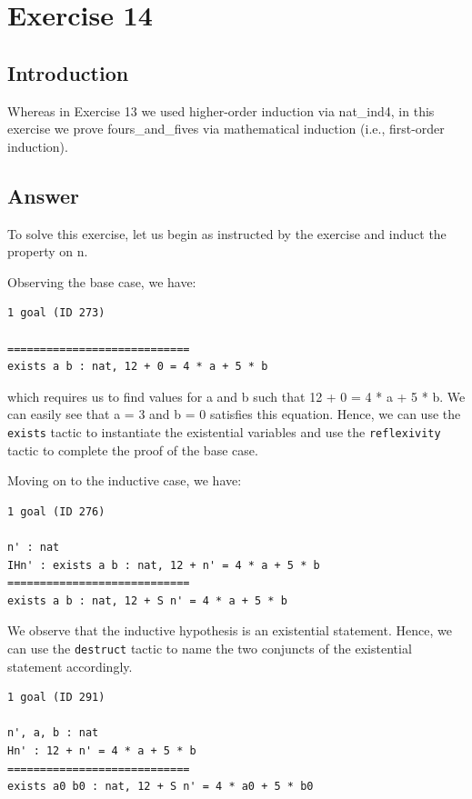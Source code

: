 \documentclass{article}
\begin{document}
\newpage

\section{Exercise 14}
\subsection{Introduction}
Whereas in Exercise 13 we used higher-order induction via nat\_ind4, in this exercise we prove fours\_and\_fives via mathematical induction (i.e., first-order induction).

\subsection{Answer}

To solve this exercise, let us begin as instructed by the exercise and induct the property on n.

Observing the base case, we have:

\begin{lstlisting}
1 goal (ID 273)

============================
exists a b : nat, 12 + 0 = 4 * a + 5 * b
\end{lstlisting}

which requires us to find values for a and b such that 12 + 0 = 4 * a + 5 * b. We can easily see that a = 3 and b = 0 satisfies this equation. Hence, we can use the \texttt{exists} tactic to instantiate the existential variables and use the \texttt{reflexivity} tactic to complete the proof of the base case.

Moving on to the inductive case, we have:

\begin{lstlisting}
1 goal (ID 276)

n' : nat
IHn' : exists a b : nat, 12 + n' = 4 * a + 5 * b
============================
exists a b : nat, 12 + S n' = 4 * a + 5 * b
\end{lstlisting}

We observe that the inductive hypothesis is an existential statement. Hence, we can use the \texttt{destruct} tactic to name the two conjuncts of the existential statement accordingly. 

\begin{lstlisting}
1 goal (ID 291)

n', a, b : nat
Hn' : 12 + n' = 4 * a + 5 * b
============================
exists a0 b0 : nat, 12 + S n' = 4 * a0 + 5 * b0
\end{lstlisting}
\end{document}
